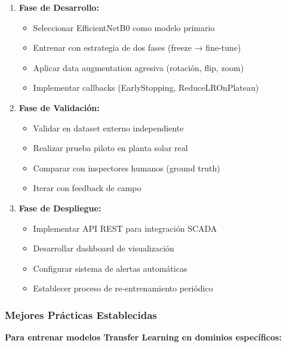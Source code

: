 \documentclass[11pt, a4paper]{article}
\begin{document}
\begin{enumerate}
    \item \textbf{Fase de Desarrollo:}
    \begin{itemize}
        \item Seleccionar EfficientNetB0 como modelo primario
        \item Entrenar con estrategia de dos fases (freeze → fine-tune)
        \item Aplicar data augmentation agresiva (rotación, flip, zoom)
        \item Implementar callbacks (EarlyStopping, ReduceLROnPlateau)
    \end{itemize}
    
    \item \textbf{Fase de Validación:}
    \begin{itemize}
        \item Validar en dataset externo independiente
        \item Realizar prueba piloto en planta solar real
        \item Comparar con inspectores humanos (ground truth)
        \item Iterar con feedback de campo
    \end{itemize}
    
    \item \textbf{Fase de Despliegue:}
    \begin{itemize}
        \item Implementar API REST para integración SCADA
        \item Desarrollar dashboard de visualización
        \item Configurar sistema de alertas automáticas
        \item Establecer proceso de re-entrenamiento periódico
    \end{itemize}
\end{enumerate}

\subsubsection{Mejores Prácticas Establecidas}

\textbf{Para entrenar modelos Transfer Learning en dominios específicos:}
\end{document}
